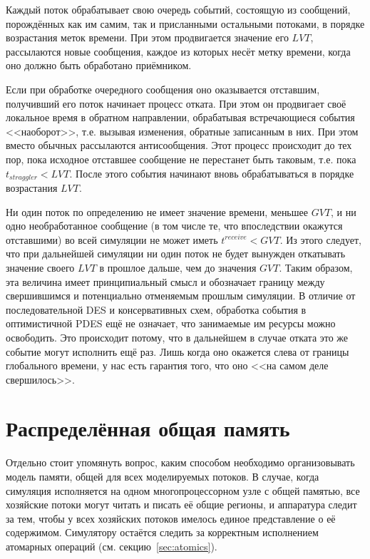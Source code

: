 \begin{itemize*}
\item Каждый поток обрабатывает свою очередь событий, состоящую из сообщений, порождённых как им самим, так и присланными остальными потоками, в порядке возрастания меток времени. При этом продвигается значение его $LVT$, рассылаются новые сообщения, каждое из которых несёт метку времени, когда оно должно быть обработано приёмником.

\item Если при обработке очередного сообщения оно оказывается отставшим, получивший его поток начинает процесс отката. При этом он продвигает своё локальное время в обратном направлении, обрабатывая встречающиеся события <<наоборот>>, т.е. вызывая изменения, обратные записанным в них. При этом вместо обычных рассылаются антисообщения. Этот процесс происходит до тех пор, пока исходное отставшее сообщение не перестанет быть таковым, т.е. пока $t_{straggler} < LVT$. После этого события начинают вновь обрабатываться в порядке возрастания $LVT$.

\item Ни один поток по определению не имеет значение времени, меньшее $GVT$, и ни одно необработанное сообщение (в том числе те, что впоследствии окажутся отставшими) во всей симуляции не может иметь $t^{receive} < GVT$. Из этого следует, что при дальнейшей симуляции ни один поток не будет вынужден откатывать значение своего $LVT$ в прошлое дальше, чем до значения $GVT$. Таким образом, эта величина имеет принципиальный смысл и обозначает границу между свершившимся и потенциально отменяемым прошлым симуляции. В отличие от последовательной DES и консервативных схем, обработка события в оптимистичной PDES ещё не означает, что занимаемые им ресурсы можно освободить. Это происходит потому, что в дальнейшем в случае отката это же событие могут исполнить ещё раз. Лишь когда оно окажется слева от границы глобального времени, у нас есть гарантия того, что оно <<на самом деле свершилось>>.

\end{itemize*}

\section{Распределённая общая память}

Отдельно стоит упомянуть вопрос, каким способом необходимо организовывать модель памяти, общей для всех моделируемых потоков. В случае, когда симуляция исполняется на одном многопроцессорном узле с общей памятью, все хозяйские потоки могут читать и писать её общие регионы, и аппаратура следит за тем, чтобы у всех хозяйских потоков имелось единое представление о её содержимом. Симулятору остаётся следить за корректным исполнением атомарных операций (см. секцию~\ref{sec:atomics}).

